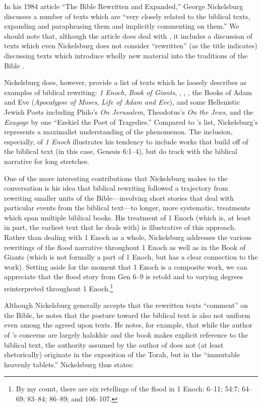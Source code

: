 In his 1984 article ``The Bible Rewritten and Expanded,'' George
Nickelsburg discusses a number of texts which are ``very closely related
to the biblical texts, expanding and paraphrasing them and implicitly
commenting on them.''\autocite[89]{nickelsburg_stone1984} We should note
that, although the article does deal with \rwb, it
includes a discussion of texts which even Nickelsburg does not consider
``rewritten'' (as the title indicates) discussing texts which introduce
wholly new material into the traditions of the Bible
\autocite[89--90]{nickelsburg_stone1984}.

Nickelsburg does, however, provide a list of texts which he loosely
describes as examples of biblical rewriting: \emph{1 Enoch}, \emph{Book
of Giants}, \jub, \ga,
\ant, the Books of Adam and Eve (\emph{Apocalypse of
Moses}, \emph{Life of Adam and Eve}), and some Hellenistic Jewish Poets
including Philo's \emph{On Jerusalem}, Theodotus's \emph{On the Jews},
and the \emph{Exagoge} by one ``Ezekiel the Poet of Tragedies.''
Compared to \vermes's list, Nickelsburg's represents a
maximalist understanding of the \rwb phenomenon. The
inclusion, especially, of \emph{1 Enoch} illustrates his tendency to
include works that build off of the biblical text (in this case, Genesis
6:1--4), but do track with the biblical narrative for long stretches.

One of the more interesting contributions that Nickelsburg makes to the
conversation is his idea that biblical rewriting followed a trajectory
from rewriting smaller units of the Bible---involving short stories that
deal with particular events from the biblical text---to longer, more
systematic, treatments which span multiple biblical books. His treatment
of 1 Enoch (which is, at least in part, the earliest text that he deals
with) is illustrative of this approach. Rather than dealing with 1 Enoch
as a whole, Nickelsburg addresses the various rewritings of the flood
narrative throughout 1 Enoch as well as in the Book of Giants (which is
not formally a part of 1 Enoch, but has a clear connection to the work).
Setting aside for the moment that 1 Enoch is a composite work, we can
appreciate that the flood story from Gen 6--9 is retold and to varying
degrees reinterpreted throughout 1 Enoch.\footnote{By my count, there
  are six retellings of the flood in 1 Enoch: 6--11; 54:7; 64--69;
  83--84; 86--89; and 106--107.}

Although Nickelsburg generally accepts that the rewritten texts
``comment'' on the Bible, he notes that the posture toward the biblical
text is also not uniform even among the agreed upon \rwb
texts. He notes, for example, that while the author of
\jub's concerns are largely halakhic and the book makes
explicit reference to the biblical text, the authority assumed by the
author of \jub does not (at least rhetorically)
originate in the exposition of the Torah, but in the ``immutable
heavenly tablets.''\autocite[100--101]{nickelsburg_stone1984}
Nickelsburg thus states:

